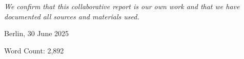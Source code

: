 \chapter*{}
\vspace{17cm}
\hfill\parbox{8cm}{
\raggedleft
	\textit{We confirm that this collaborative report is our own work and that we have documented all sources and materials used.}\par 
	\vspace{1em}
	Berlin, 30 June 2025

	\vspace{3em}
	{\footnotesize Word Count: 2,892}
}
\thispagestyle{plain}